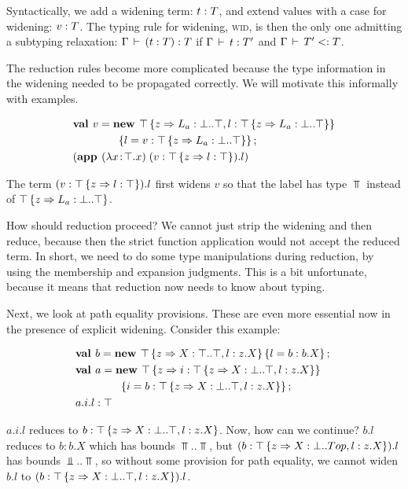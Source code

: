 \documentclass[9pt]{sigplanconf}
\begin{document}
Syntactically, we add a widening term: $t : T$, and extend values
with a case for widening: $v : T$. The typing rule for widening,
\textsc{wid}, is then the only one admitting a subtyping relaxation:
$\Gamma \,\vdash\, (t : T) : T$ if $\Gamma \,\vdash\, t : T'$ and $\Gamma \,\vdash\, T'
<: T$.

The reduction rules become more complicated because the type
information in the widening needed to be propagated correctly. We will
motivate this informally with examples.

\begin{align*}
&\mlnew v {\Top \refine z {\Ldecl {L_a} \Bot \Top, \ldecl l {\Top \refine z {\Ldecl {L_a} \Bot \Top}}}\\
&\gap\gap\ldefs{l = \wid v {\Top \refine z {\Ldecl {L_a} \Bot \Top}}}}{
\app {(\abs x \Top x)} {(\wid v {\Top \refine z {\ldecl l \Top}}).l}
}
\end{align*}

The term $(v : \top \left\{z \Rightarrow l : \top \right\}).l$ first widens
$v$ so that the label has type $\Top$ instead of $\top \left\{z \Rightarrow L_a : \bot..\top \right\}$.

How should reduction proceed? We cannot just strip the widening and
then reduce, because then the strict function application would not
accept the reduced term. In short, we need to do some type
manipulations during reduction, by using the membership and expansion
judgments. This is a bit unfortunate, because it means that reduction
now needs to know about typing.

Next, we look at path equality provisions. These are even more
essential now in the presence of explicit widening. Consider this
example:

\begin{align*}
&\mlnew b {\Top \refine z {\Ldecl X \Top \Top, \ldecl l {z.X}} \ldefs{l = \wid b {b.X}}}{
\mlnew a {\Top \refine z {\ldecl i {\Top \refine z {\Ldecl X \Bot \Top, \ldecl l {z.X}}}}\\
&\gap\gap\ldefs{i = \wid b {\Top \refine z {\Ldecl X \Bot \Top, \ldecl l {z.X}}}}}}{
\wid {a.i.l} \Top
}
\end{align*}

$a.i.l$ reduces to $b : \top \left\{z \Rightarrow X : \bot..\top, l : z.X \right\}$. Now, how can we continue? $b.l$ reduces to $b : b.X$
which has bounds $\Top..\Top$, but $(b : \top \left\{z \Rightarrow X : \bot..Top, l : z.X \right\}).l$ has bounds $\Bot..\Top$, so without
some provision for path equality, we cannot widen $b.l$ to $(b : \top \left\{z \Rightarrow X : \bot..\top, l : z.X \right\}).l$.
\end{document}
